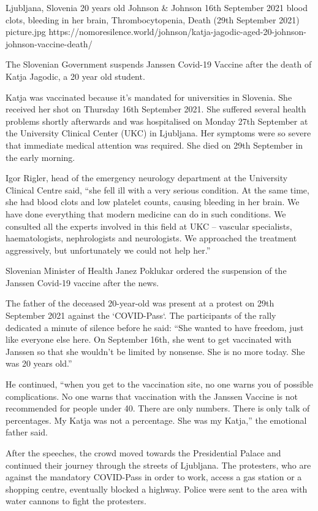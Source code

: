 {Ljubljana, Slovenia}
{20 years old}
{Johnson \& Johnson}
{16th September 2021}
{blood clots, bleeding in her brain, Thrombocytopenia,
  Death (29th September 2021)}
{picture.jpg}
{https://nomoresilence.world/johnson/katja-jagodic-aged-20-johnson-johnson-vaccine-death/}
{

The Slovenian Government suspends Janssen Covid-19 Vaccine after the death of
Katja Jagodic, a 20 year old student.

Katja was vaccinated because it’s mandated for universities in Slovenia. She
received her shot on Thursday 16th September 2021. She suffered several health
problems shortly afterwards and was hospitalised on Monday 27th September at the
University Clinical Center (UKC) in Ljubljana. Her symptoms were so severe that
immediate medical attention was required. She died on 29th September in the
early morning.

Igor Rigler, head of the emergency neurology department at the University
Clinical Centre said, “she fell ill with a very serious condition. At the same
time, she had blood clots and low platelet counts, causing bleeding in her
brain. We have done everything that modern medicine can do in such
conditions. We consulted all the experts involved in this field at UKC –
vascular specialists, haematologists, nephrologists and neurologists. We
approached the treatment aggressively, but unfortunately we could not help her.”

Slovenian Minister of Health Janez Poklukar ordered the suspension of the
Janssen Covid-19 vaccine after the news.

The father of the deceased 20-year-old was present at a protest on 29th
September 2021 against the ‘COVID-Pass‘. The participants of the rally dedicated
a minute of silence before he said: “She wanted to have freedom, just like
everyone else here. On September 16th, she went to get vaccinated with Janssen
so that she wouldn’t be limited by nonsense. She is no more today. She was 20
years old.”

He continued, “when you get to the vaccination site, no one warns you of
possible complications. No one warns that vaccination with the Janssen Vaccine
is not recommended for people under 40. There are only numbers. There is only
talk of percentages. My Katja was not a percentage. She was my Katja,” the
emotional father said.

After the speeches, the crowd moved towards the Presidential Palace and
continued their journey through the streets of Ljubljana. The protesters, who
are against the mandatory COVID-Pass in order to work, access a gas station or a
shopping centre, eventually blocked a highway. Police were sent to the area with
water cannons to fight the protesters.

}
